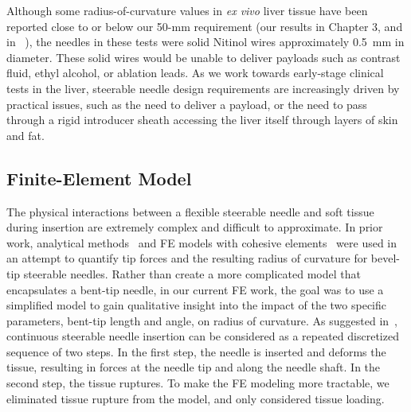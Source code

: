 Although some radius-of-curvature values in \textit{ex vivo} liver tissue have been reported close to or below our 50-mm requirement (our results in Chapter 3, and in ~\cite{Majewicz2010}), the needles in these tests were solid Nitinol wires approximately 0.5~mm in diameter. These solid wires would be unable to deliver payloads such as contrast fluid, ethyl alcohol, or ablation leads. As we work towards early-stage clinical tests in the liver, steerable needle design requirements are increasingly driven by practical issues, such as the need to deliver a payload, or the need to pass through a rigid introducer sheath accessing the liver itself through layers of skin and fat.

\subsection{Finite-Element Model}
The physical interactions between a flexible steerable needle and soft tissue during insertion are extremely complex and difficult to approximate. In prior work, analytical methods~\cite{Misra2010} and FE models with cohesive elements~\cite{Misra2008} were used in an attempt to quantify tip forces and the resulting radius of curvature for bevel-tip steerable needles. Rather than create a more complicated model that encapsulates a bent-tip needle, in our current FE work, the goal was to use a simplified model to gain qualitative insight into the impact of the two specific parameters, bent-tip length and angle, on radius of curvature. As suggested in~\cite{Mahvash2001,Misra2010,Barbe2007}, continuous steerable needle insertion can be considered as a repeated discretized sequence of two steps. In the first step, the needle is inserted and deforms the tissue, resulting in forces at the needle tip and along the needle shaft. In the second step, the tissue ruptures. To make the FE modeling more tractable, we eliminated tissue rupture from the model, and only considered tissue loading. 

